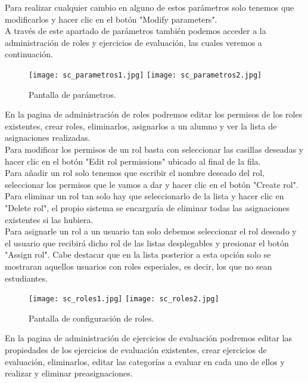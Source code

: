 Para realizar cualquier cambio en alguno de estos parámetros solo tenemos que modificarlos y hacer clic en el botón "Modify parameters".\\

A través de este apartado de parámetros también podemos acceder a la administración de roles y ejercicios de evaluación, las cuales veremos a continuación.

\begin{figure}[h!]
	\centering
	\texttt{[image: sc\_parametros1.jpg]}
	\texttt{[image: sc\_parametros2.jpg]}
	\caption{Pantalla de parámetros.}
\end{figure}
\clearpage

En la pagina de administración de roles podremos editar los permisos de los roles existentes, crear roles, eliminarlos, asignarlos a un alumno y ver la lista de asignaciones realizadas.\\

Para modificar los permisos de un rol basta con seleccionar las casillas deseadas y hacer clic en el botón "Edit rol permissions" ubicado al final de la fila. \\

Para añadir un rol solo tenemos que escribir el nombre deseado del rol, seleccionar los permisos que le vamos a dar y hacer clic en el botón "Create rol".\\

Para eliminar un rol tan solo hay que seleccionarlo de la lista y hacer clic en "Delete rol", el propio sistema se encargaría de eliminar todas las asignaciones existentes si las hubiera.\\

Para asignarle un rol a un usuario tan solo debemos seleccionar el rol deseado y el usuario que recibirá dicho rol de las listas desplegables y presionar el botón "Assign rol". Cabe destacar que en la lista posterior a esta opción solo se mostraran aquellos usuarios con roles especiales, es decir, los que no sean estudiantes.\\

\begin{figure}[h!]
	\centering
	\texttt{[image: sc\_roles1.jpg]}
	\texttt{[image: sc\_roles2.jpg]}
	\caption{Pantalla de configuración de roles.}
\end{figure}
\clearpage

En la pagina de administración de ejercicios de evaluación podremos editar las propiedades de los ejercicios de evaluación existentes, crear ejercicios de evaluación, eliminarlos, editar las categorías a evaluar en cada uno de ellos y realizar y eliminar preasignaciones.\\

